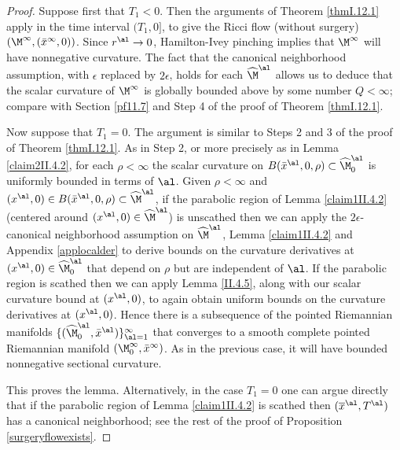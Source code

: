 \begin{proof}
Suppose first that $T_1 < 0$.
Then the arguments of Theorem \ref{thmI.12.1} apply in the
time interval $(T_1, 0]$, to give the Ricci flow (without
surgery) $(\M^\infty,(\bar x^\infty,0))$.
Since $r^{\al} \rightarrow 0$, Hamilton-Ivey pinching
implies that $\M^\infty$ will have nonnegative curvature.
The fact that the
canonical neighborhood assumption,
with $\epsilon$ replaced by $2 \epsilon$,
holds for each $\widehat\M^\al$ allows us
to deduce
that the scalar curvature of $\M^\infty$ is globally bounded above by
some number $Q<\infty$; compare with Section \ref{pf11.7}
and Step 4 of the proof of Theorem \ref{thmI.12.1}.

Now suppose that $T_1 = 0$.
The argument is similar to Steps 2 and 3 of the proof of Theorem
\ref{thmI.12.1}.
As in Step 2,
or more precisely as in  Lemma \ref{claim2II.4.2},
for each $\rho < \infty$
the scalar curvature on
$B(\bar x^\al, 0, \rho) \subset \widehat\M^{\al}_0$
is uniformly bounded in terms of $\al$.
Given $\rho < \infty$ and
$(x^\al,0) \in B(\bar x^\al, 0, \rho) \subset \widehat\M^\al$,
if the parabolic region of
Lemma \ref{claim1II.4.2} (centered around
$(x^\al, 0) \in \widehat\M^\al$) is unscathed then we can
apply
the $2 \epsilon$-canonical neighborhood assumption
on $\widehat\M^\al$, Lemma \ref{claim1II.4.2} and Appendix \ref{applocalder}
to derive bounds on the curvature derivatives at
$(x^\al,0) \in \widehat\M^\al_0$
that depend on $\rho$ but are independent of $\al$.
If the parabolic region is scathed then we can apply Lemma
\ref{II.4.5}, along with our scalar curvature bound at
$(x^\al,0)$,
to again obtain uniform bounds on the curvature derivatives at
$(x^\al,0)$.
Hence there is a subsequence of
the pointed Riemannian manifolds
$\{(\widehat\M^\al_0, \bar x^\al)\}_{\al = 1}^\infty$
that converges to a smooth complete pointed
Riemannian manifold $(\M^\infty_0, \bar x^\infty)$.
As in the previous case, it will have
bounded nonnegative sectional curvature.

This proves the lemma.  Alternatively, in the case $T_1 = 0$
one can argue directly that if the parabolic region of
Lemma \ref{claim1II.4.2} is scathed then
$(\overline{x}^\al, T^\al)$ has a canonical neighborhood;
see the rest of the proof of Proposition \ref{surgeryflowexists}.
\end{proof}
